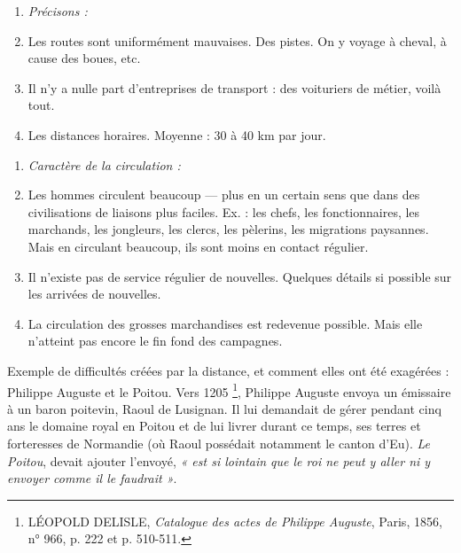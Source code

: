\documentclass[french,twoside]{book} %
\newlength{\listmod}
\newcommand{\listhead}[1]{\hspace{-1\listmod}\emph{#1}}
\newcommand\chapteropen{} %
\newcommand\chapterclose{} %
\begin{document}
\begin{enumerate}[itemsep=0pt,]
\item[]\listhead{Précisons :}
\item Les routes sont uniformément mauvaises. Des pistes. On y voyage à cheval, à cause des boues, etc.
\item Il n’y a nulle part d’entreprises de transport : des voituriers de métier, voilà tout.
\item Les distances horaires. Moyenne : 30 à 40 km par jour.

\end{enumerate}
\begin{enumerate}[itemsep=0pt,]
\item[]\listhead{Caractère de la circulation :}
\item Les hommes circulent beaucoup — plus en un certain sens que dans des civilisations de liaisons plus faciles. Ex. : les chefs, les fonctionnaires, les marchands, les jongleurs, les clercs, les pèlerins, les migrations paysannes. Mais en circulant beaucoup, ils sont moins en contact régulier.
\item Il n’existe pas de service régulier de nouvelles. Quelques détails si possible sur les arrivées de nouvelles.
\item La circulation des grosses marchandises est redevenue possible. Mais elle n’atteint pas encore le fin fond des campagnes.

\end{enumerate}\noindent Exemple de difficultés créées par la distance, et comment elles ont été exagérées : Philippe Auguste et le Poitou. Vers 1205 \footnote{ LÉOPOLD DELISLE, {\itshape Catalogue des actes de Philippe Auguste}, Paris, 1856, n° 966, p. 222 et p. 510-511.}, Philippe Auguste envoya un émissaire à un baron poitevin, Raoul de Lusignan. Il lui demandait de gérer pendant cinq ans le domaine royal en Poitou et de lui livrer durant ce temps, ses terres et forteresses de Normandie (où Raoul possédait notamment le canton d’Eu). \emph{Le Poitou}, devait ajouter l’envoyé, \emph{« est si lointain que le roi ne peut y aller ni y envoyer comme il le faudrait »}.
\chapterclose


\chapteropen
\end{document}
